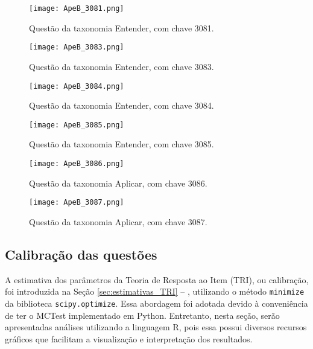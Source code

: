\begin{figure}[!ht]
    \centering
    \texttt{[image: ApeB\_3081.png]}
     \caption{Questão da taxonomia Entender, com chave 3081.}
  \label{fig:ApeB_3081}
\end{figure}

\begin{figure}[!ht]
    \centering
    \texttt{[image: ApeB\_3083.png]}
     \caption{Questão da taxonomia Entender, com chave 3083.}
  \label{fig:ApeB_3083}
\end{figure}

\begin{figure}[!ht]
    \centering
    \texttt{[image: ApeB\_3084.png]}
     \caption{Questão da taxonomia Entender, com chave 3084.}
  \label{fig:ApeB_3084}
\end{figure}

\begin{figure}[!ht]
    \centering
    \texttt{[image: ApeB\_3085.png]}
     \caption{Questão da taxonomia Entender, com chave 3085.}
  \label{fig:ApeB_3085}
\end{figure}

\begin{figure}[!ht]
    \centering
    \texttt{[image: ApeB\_3086.png]}
     \caption{Questão da taxonomia Aplicar, com chave 3086.}
  \label{fig:ApeB_3086}
\end{figure}

\begin{figure}[!ht]
    \centering
    \texttt{[image: ApeB\_3087.png]}
     \caption{Questão da taxonomia Aplicar, com chave 3087.}
  \label{fig:ApeB_3087}
\end{figure}

\subsection{Calibração das questões}\label{sec:calibracao}

A estimativa dos parâmetros da Teoria de Resposta ao Item (TRI), ou calibração, foi introduzida na Seção \ref{sec:estimativas_TRI} -- , utilizando o método \verb|minimize| da biblioteca \verb|scipy.optimize|. Essa abordagem foi adotada devido à conveniência de ter o MCTest implementado em Python. Entretanto, nesta seção, serão apresentadas análises utilizando a linguagem R, pois essa possui diversos recursos gráficos que facilitam a visualização e interpretação dos resultados.

